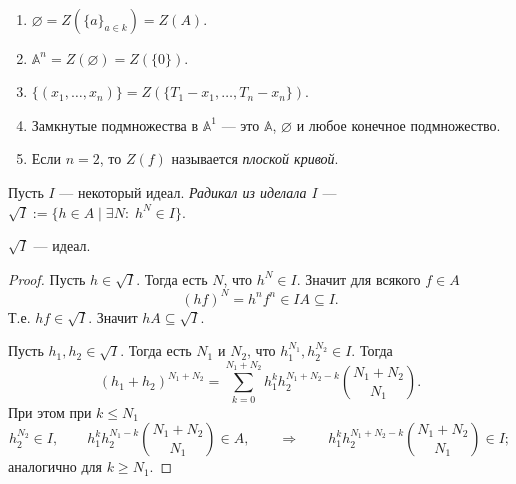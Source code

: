 \documentclass[12pt,a4paper]{article}
\renewcommand{\AA}{\ensuremath{\mathbb{A}}\xspace}
\begin{document}
    \begin{example}\ 
        \begin{enumerate}
            \item $\varnothing = Z(\{a\}_{a \in k}) = Z(A)$.
            \item $\AA^n = Z(\varnothing) = Z(\{0\})$.
            \item $\{(x_1, \dots, x_n)\} = Z(\{T_1 - x_1, \dots, T_n - x_n\})$.
            \item Замкнутые подмножества в $\AA^1$ --- это $\AA$, $\varnothing$ и любое конечное подмножество.
            \item Если $n = 2$, то $Z(f)$ называется \emph{плоской кривой}.
        \end{enumerate}
    \end{example}

    \begin{definition}
        Пусть $I$ --- некоторый идеал. \emph{Радикал из иделала $I$} --- $\sqrt{I} := \{h \in A \mid \exists N \colon \; h^N \in I\}$.
    \end{definition}

    \begin{lemma}
        $\sqrt{I}$ --- идеал.
    \end{lemma}

    \begin{proof}
        Пусть $h \in \sqrt{I}$. Тогда есть $N$, что $h^N \in I$. Значит для всякого $f \in A$
        \[(hf)^N = h^n f^n \in I A \subseteq I.\]
        Т.е. $hf \in \sqrt{I}$. Значит $hA \subseteq \sqrt{I}$.

        Пусть $h_1, h_2 \in \sqrt{I}$. Тогда есть $N_1$ и $N_2$, что $h_1^{N_1}, h_2^{N_2} \in I$. Тогда
        \[(h_1 + h_2)^{N_1 + N_2} = \sum_{k=0}^{N_1 + N_2} h_1^k h_2^{N_1 + N_2 - k} \binom{N_1 + N_2}{N_1}.\]
        При этом при $k \leqslant N_1$
        \[
            h_2^{N_2} \in I,
            \qquad
            h_1^k h_2^{N_1 - k} \binom{N_1 + N_2}{N_1} \in A,
            \qquad \Longrightarrow \qquad
            h_1^k h_2^{N_1 + N_2 - k} \binom{N_1 + N_2}{N_1} \in I;
        \]
        аналогично для $k \geqslant N_1$.
    \end{proof}
\end{document}
